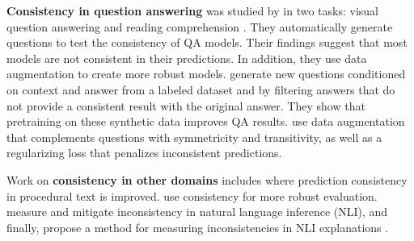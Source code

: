 \textbf{Consistency in question answering} was studied by
\citet{ribeiro-etal-2019-red} in two tasks: visual question answering \cite{vqa} and reading comprehension \cite{squad}. They automatically generate questions to test the consistency of QA models.
Their findings suggest that most models are not consistent in their predictions. In addition, they use data augmentation to create more robust models.
\citet{alberti2019synthetic} generate new questions
conditioned on  context and answer from a labeled dataset
and by filtering answers that do not provide a consistent
result with the original answer. They show that pretraining on these synthetic data improves QA results.
\citet{consistent-qa}  use data augmentation that complements questions with symmetricity and transitivity, as well as a regularizing loss that penalizes inconsistent predictions.

Work on \textbf{consistency in other domains}
includes \citep{du2019consistent} where  prediction
consistency in procedural text is improved. \citet{ribeiro-etal-2020-beyond} use consistency for more robust evaluation. \citet{li-etal-2019-logic} measure and mitigate inconsistency in natural language inference (NLI), and finally, \citet{camburu2020make} propose a method for measuring inconsistencies in NLI explanations \cite{camburu2018snli}.
